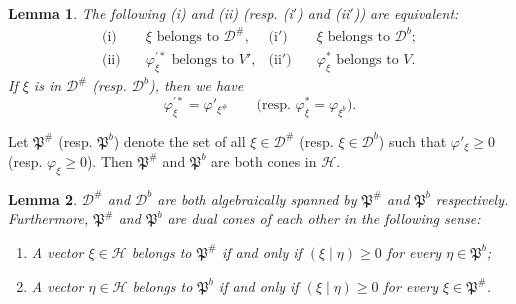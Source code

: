 \documentclass[12pt,b5paper,twoside]{article}
\theoremstyle{takesaki}
\newtheorem{lemma}{Lemma}[section]
\numberwithin{equation}{section}
\begin{document}
\begin{lemma}
\label{lem:15.1}
The following (i) and (ii) (resp. (i$'$) and (ii$'$)) are equivalent:
\begin{align*}
  \text{(i)}&\quad \xi\text{ belongs to }\mathcal D^{\#},
  &\text{(i$'$)}&\quad \xi\text{ belongs to }\mathcal D^{b};\\
  \text{(ii)}&\quad \varphi_{\xi}^{\prime *}\text{ belongs to }V',
  &\text{(ii$'$)}&\quad \varphi_{\xi}^{*}\text{ belongs to }V.
\end{align*}
If $\xi$ is in $\mathcal D^{\#}$ (resp. $\mathcal D^{b}$), then we have
\begin{equation}
  \varphi_{\xi}^{\prime *}=\varphi'_{\xi^{\#}}
  \qquad\bigl(\text{resp. }\varphi_{\xi}^{*}=\varphi_{\xi^{b}}\bigr).
  \label{eq:15.2}
\end{equation}
\end{lemma}

Let $\mathfrak P^{\#}$ (resp. $\mathfrak P^{b}$) denote the set of all
$\xi\in\mathcal D^{\#}$ (resp. $\xi\in\mathcal D^{b}$) such that
$\varphi'_{\xi}\geq0$ (resp. $\varphi_{\xi}\geq0$).  Then
$\mathfrak P^{\#}$ and $\mathfrak P^{b}$ are both cones in $\mathcal H$.

\begin{lemma}
\label{lem:15.2}
$\mathcal D^{\#}$ and $\mathcal D^{b}$ are both algebraically spanned by
$\mathfrak P^{\#}$ and $\mathfrak P^{b}$ respectively.  Furthermore,
$\mathfrak P^{\#}$ and $\mathfrak P^{b}$ are dual cones of each other in
the following sense:
\begin{enumerate}[label=(\roman*)]
  \item A vector $\xi\in\mathcal H$ belongs to $\mathfrak P^{\#}$ if and
  only if $(\xi\mid\eta)\geq0$ for every $\eta\in\mathfrak P^{b}$;
  \item A vector $\eta\in\mathcal H$ belongs to $\mathfrak P^{b}$ if and
  only if $(\xi\mid\eta)\geq0$ for every $\xi\in\mathfrak P^{\#}$.
\end{enumerate}
\end{lemma}
\end{document}
